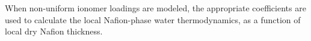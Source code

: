 \documentclass[final,3p,times,twocolumn]{elsarticle}    %
\begin{document}
When non-uniform ionomer loadings are modeled, the appropriate coefficients are used to calculate the local Nafion-phase water thermodynamics, as a function of local dry Nafion thickness. 
\end{document}
